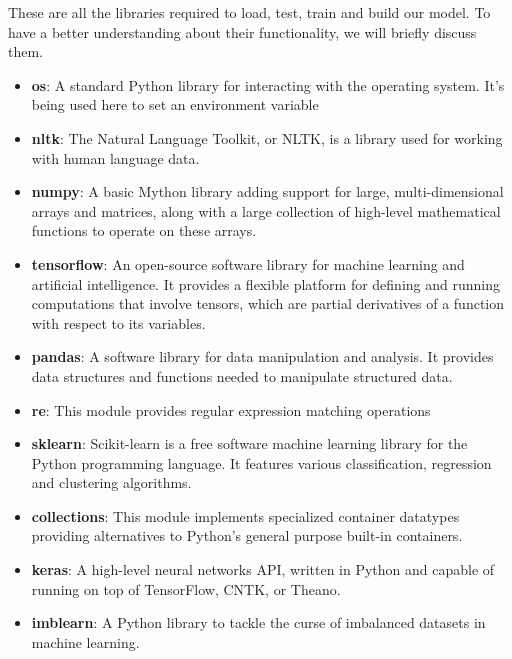 These are all the libraries required to load, test, train and build our model. To have a better understanding about their functionality, we will briefly discuss them.
\begin{itemize}
	\item \textbf{os}: A standard Python library for interacting with the operating system. It's being used here to set an environment variable
	
	\item \textbf{nltk}: The Natural Language Toolkit, or NLTK, is a library used for working with human language data.
	
	\item \textbf{numpy}: A basic Mython library adding support for large, multi-dimensional arrays and matrices, along with a large collection of high-level mathematical functions to operate on these arrays.
	
	\item \textbf{tensorflow}: An open-source software library for machine learning and artificial intelligence. It provides a flexible platform for defining and running computations that involve tensors, which are partial derivatives of a function with respect to its variables.
	
	\item \textbf{pandas}: A software library for data manipulation and analysis. It provides data structures and functions needed to manipulate structured data.
	
	\item \textbf{re}: This module provides regular expression matching operations
	
	\item \textbf{sklearn}: Scikit-learn is a free software machine learning library for the Python programming language. It features various classification, regression and clustering algorithms.
	
	\item \textbf{collections}: This module implements specialized container datatypes providing alternatives to Python’s general purpose built-in containers.
	
	\item \textbf{keras}: A high-level neural networks API, written in Python and capable of running on top of TensorFlow, CNTK, or Theano.
	
	\item \textbf{imblearn}: A Python library to tackle the curse of imbalanced datasets in machine learning.
\end{itemize}

